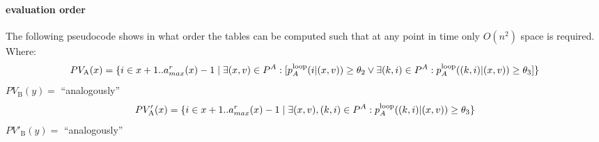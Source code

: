 \documentclass{article}
\newcommand{\pInLoop}[3]{p_{#1}^\textrm{loop}(#2|#3)}
\newcommand{\pInLoopA}[2]{\pInLoop{A}{#1}{#2}}
\newcommand{\probVecA}[1]{PV_\textrm{A}(#1)}
\newcommand{\probVecB}[1]{PV_\textrm{B}(#1)}
\newcommand{\probPrimeVecA}[1]{PV'_\textrm{A}(#1)}
\newcommand{\probPrimeVecB}[1]{PV'_\textrm{B}(#1)}
\newcommand{\thetaTwo}{\theta_2}
\newcommand{\thetaThree}{\theta_3}
\begin{document}
\newpage
\paragraph{evaluation order}
The following pseudocode shows in what order the tables can be
computed such that at any point in time only $O(n^2)$ space is
required.\\
Where:\\
\begin{displaymath}
\probVecA{x} = \{ i \in x+1..a^r_{max}(x) - 1 \mid \exists (x,v) \in P^A: [ \pInLoopA{i}{(x,v)} \geq \thetaTwo \lor \exists(k,i) \in P^A: \pInLoopA{(k,i)}{(x,v)} \geq \thetaThree]\}\\
\end{displaymath}
$\probVecB{y} = $  ``analogously''
\begin{displaymath}
\probPrimeVecA{x} = \{ i \in x+1..a^r_{max}(x) - 1 \mid \exists (x,v),(k,i) \in P^A: \pInLoopA{(k,i)}{(x,v)} \geq \thetaThree\}\\
\end{displaymath}
$\probPrimeVecB{y} = $  ``analogously''\\
\end{document}
